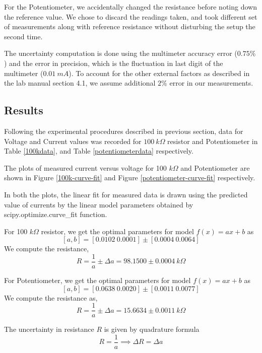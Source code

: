 \documentclass[letterpaper,12pt]{article}
\begin{document}
For the Potentiometer, we accidentally changed the resistance before noting down the reference value. We chose to
discard the readings taken, and took different set of measurements along with reference resistance without disturbing
the setup the second time.

The uncertainty computation is done using the multimeter accuracy error ($0.75 \%$) and the error in 
precision, which is the fluctuation in last digit of the multimeter ($0.01\ mA$). To account for the other
external factors as described in the lab manual section 4.1\cite{lab-manual-ex1}, we assume additional $2\%$ error in our measurements.

\subsection{Results}

Following the experimental procedures described in previous section, data for Voltage and Current values was recorded for 
$100\ k\Omega$ resistor and Potentiometer in Table \ref{100kdata}, and Table \ref{potentiometerdata} respectively.

The plots of measured current versus voltage for 100 $k\Omega$ and Potentiometer are shown in Figure \ref{100k-curve-fit}
and Figure \ref{potentiometer-curve-fit} respectively.

In both the plots, the linear fit for measured data is drawn using the predicted value of currents by the linear model  parameters
obtained by scipy.optimize.curve\_fit function.



For 100 $k\Omega$ resistor, we get the optimal parameters for model $f(x)= ax+b$ as
$$[a,b] = [0.0102\ 0.0001] \pm [0.0004\ 0.0064]$$
We compute the resistance,
$$R = \frac{1}{a} \pm \Delta a= 98.1500 \pm 0.0004 \ k\Omega$$

For Potentiometer, we get the optimal parameters for model $f(x)= ax+b$ as
$$[a,b] = [0.0638\ 0.0020] \pm [0.0011\ 0.0077]$$
We compute the resistance as,
$$R = \frac{1}{a} \pm \Delta a= 15.6634 \pm 0.0011 \ k\Omega$$

The uncertainty in resistance $R$ is given by quadrature formula
$$R = \frac{1}{a} \implies \Delta R = \Delta a$$
\end{document}
